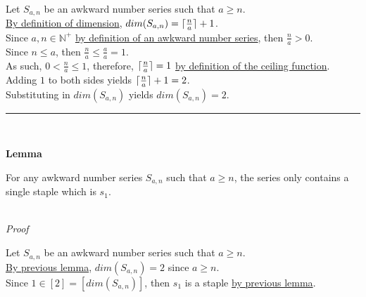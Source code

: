 \documentclass[a4paper,12pt]{article}
\DeclarePairedDelimiter{\ceil}{\lceil}{\rceil}
\begin{document}
\noindent Let $S_{a, n}$ be an awkward number series such that $a \geq n$.\\

\noindent \hyperlink{definition:dimension}{By definition of dimension}, $dim(S_{a,n}) = \ceil{\frac{n}{a}} + 1$.\\

\noindent Since $a, n \in \mathbb{N}^+$ \hyperlink{definition:awkward_number_series}{by definition of an awkward number series}, then $\frac{n}{a} > 0$.\\

\noindent Since $n \leq a$, then $\frac{n}{a} \leq \frac{a}{a} = 1$.\\

\noindent As such, $0 < \frac{n}{a} \leq 1$, therefore, $\ceil{\frac{n}{a}} = 1$ \hyperlink{definition:ceiling_function}{by definition of the ceiling function}.\\

\noindent Adding $1$ to both sides yields $\ceil{\frac{n}{a}} + 1 = 2$.\\

\noindent Substituting in $dim(S_{a, n})$ yields $dim(S_{a,n}) = 2$.\\

\begin{center}
\noindent\rule{8cm}{0.4pt}
\end{center}
\noindent \\









\label{lemma:only_staple}
\hypertarget{lemma:only_staple}{}
\begin{tcolorbox}
\textbf{Lemma}

\noindent For any awkward number series $S_{a,n}$ such that $a \geq n$, the series only contains a single staple which is $s_1$.

\end{tcolorbox}

\noindent \\
\textit{Proof}

\noindent Let $S_{a, n}$ be an awkward number series such that $a \geq n$.\\

\noindent \hyperlink{lemma:dimension_a_greater_equal_n}{By previous lemma}, $dim(S_{a, n}) = 2$ since $a \geq n$.\\

\noindent Since $1 \in [2] = [dim(S_{a, n})]$, then $s_1$ is a staple \hyperlink{lemma:initial_staples}{by previous lemma}.\\
\end{document}
